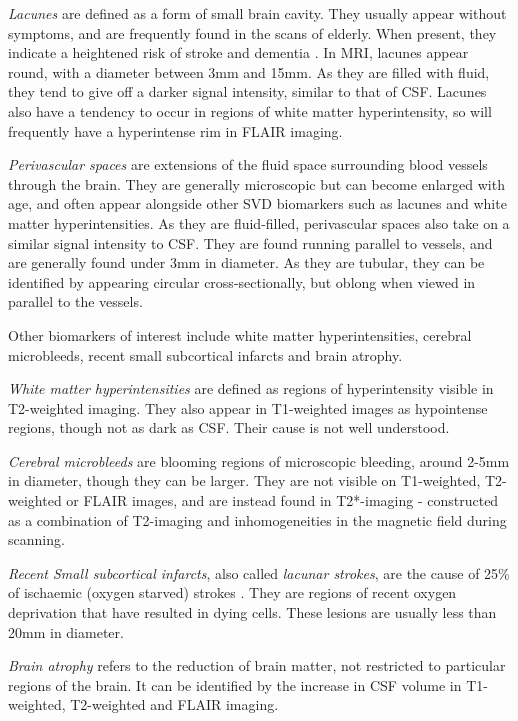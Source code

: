 \textit{Lacunes} are defined as a form of small brain cavity. They usually appear without symptoms, and are frequently found in the scans of elderly. When present, they indicate a heightened risk of stroke and dementia \cite{VanDerFlierM.Wiesje2005SVDa, BenjaminJ.Philip2018LIbN}. In MRI, lacunes appear round, with a diameter between 3mm and 15mm. As they are filled with fluid, they tend to give off a darker signal intensity, similar to that of CSF. Lacunes also have a tendency to occur in regions of white matter hyperintensity, so will frequently have a hyperintense rim in FLAIR imaging.

\textit{Perivascular spaces} are extensions of the fluid space surrounding blood vessels through the brain. They are generally microscopic but can become enlarged with age, and often appear alongside other SVD biomarkers such as lacunes and white matter hyperintensities. As they are fluid-filled, perivascular spaces also take on a similar signal intensity to CSF. They are found running parallel to vessels, and are generally found under 3mm in diameter. As they are tubular, they can be identified by appearing circular cross-sectionally, but oblong when viewed in parallel to the vessels.

Other biomarkers of interest include white matter hyperintensities, cerebral microbleeds, recent small subcortical infarcts and brain atrophy. 

\textit{White matter hyperintensities} are defined as regions of hyperintensity visible in T2-weighted imaging. They also appear in T1-weighted images as hypointense regions, though not as dark as CSF. Their cause is not well understood.

\textit{Cerebral microbleeds} are blooming regions of microscopic bleeding, around 2-5mm in diameter, though they can be larger. They are not visible on T1-weighted, T2-weighted or FLAIR images, and are instead found in T2*-imaging - constructed as a combination of T2-imaging and inhomogeneities in the magnetic field during scanning. 

\textit{Recent Small subcortical infarcts}, also called \textit{lacunar strokes}, are the cause of 25\% of ischaemic (oxygen starved) strokes \cite{WardlawJ.M.2013Nsfr}. They are regions of recent oxygen deprivation that have resulted in dying cells. These lesions are usually less than 20mm in diameter. 

\textit{Brain atrophy} refers to the reduction of brain matter, not restricted to particular regions of the brain. It can be identified by the increase in CSF volume in T1-weighted, T2-weighted and FLAIR imaging.

